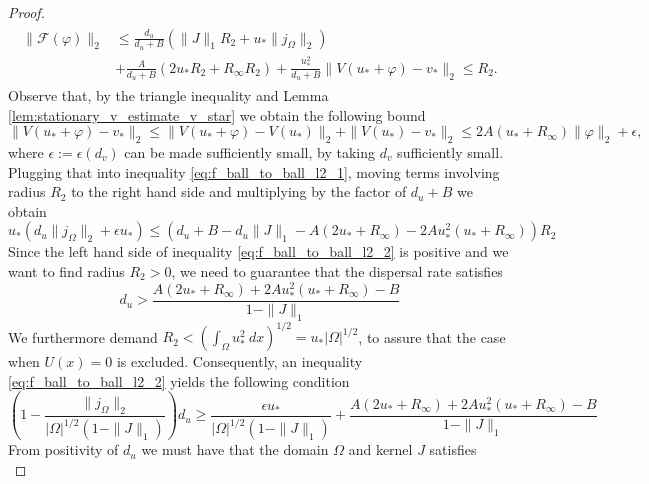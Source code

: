 \documentclass[12pt, a4paper]{article}
\theoremstyle{break}
\theoremstyle{break}
\theoremstyle{break}
\theoremstyle{break}
\theoremstyle{break}
\theoremstyle{break}
\theoremstyle{break}
\begin{document}
\begin{proof}
\begin{align}
        \begin{split}
            \|\mathcal{F}(\varphi)\|_2
            &\leq
            \frac{d_u }{d_u + B} \left( \|J\|_1 R_2 + u_*\|j_\Omega\|_2\right) \\
            &+
            \frac{A}{d_u + B}\left( 2 u_* R_2 + R_\infty R_2 \right) 
            + \frac{u_*^2}{d_u + B} \|V(u_* + \varphi) - v_*\|_2 \leq R_2.
        \end{split}
    \end{align}
    Observe that, by the triangle inequality and Lemma \ref{lem:stationary_v_estimate_v_star} we obtain the following bound
    \begin{equation}
        \|V(u_* + \varphi) - v_*\|_2 \leq \|V(u_* + \varphi) - V(u_*)\|_2 + \|V(u_*) - v_*\|_2 \leq 2A(u_* + R_\infty) \|\varphi\|_2 + \epsilon,
    \end{equation}
    where $\epsilon := \epsilon(d_v)$ can be made sufficiently small, by taking $d_v$ sufficiently small. Plugging that into inequality \eqref{eq:f_ball_to_ball_l2_1}, moving terms involving radius $R_2$ to the right hand side and multiplying by the factor of $d_u + B$ we obtain
    \begin{equation}
        \label{eq:f_ball_to_ball_l2_2}
        u_*(d_u\|j_\Omega\|_2 + \epsilon u_*)
        \leq
        \left(d_u + B - d_u \|J\|_1 - A(2u_* + R_\infty) - 2Au_*^2(u_* + R_\infty)\right) R_2
    \end{equation}
    Since the left hand side of inequality \eqref{eq:f_ball_to_ball_l2_2} is positive and we want to find radius $R_2 > 0$, we need to guarantee that the dispersal rate satisfies
    \begin{equation}
        d_u > \frac{A(2u_* + R_\infty) + 2Au_*^2(u_* + R_\infty) - B}{1 - \|J\|_1}
    \end{equation}
    We furthermore demand $R_2 < \left(\int_\Omega u_*^2 \:dx\right)^{1/2} = u_* |\Omega|^{1/2}$, to assure that the case when $U(x) = 0$ is excluded. Consequently, an inequality \eqref{eq:f_ball_to_ball_l2_2} yields the following condition
    \begin{equation}
        \label{eq:f_ball_to_ball_condition_2_final}
        \left( 1 - \frac{\|j_\Omega\|_2}{|\Omega|^{1/2}(1-\|J\|_1)} \right)d_u \geq \frac{ \epsilon u_*}{|\Omega|^{1/2} (1 - \|J\|_1)} + \frac{A(2u_* + R_\infty) + 2Au_*^2(u_* + R_\infty) - B}{1 - \|J\|_1}
    \end{equation} 
    From positivity of $d_u$ we must have that the domain $\Omega$ and kernel $J$ satisfies
    \begin{equation}

\end{equation}
\end{proof}
\end{document}
